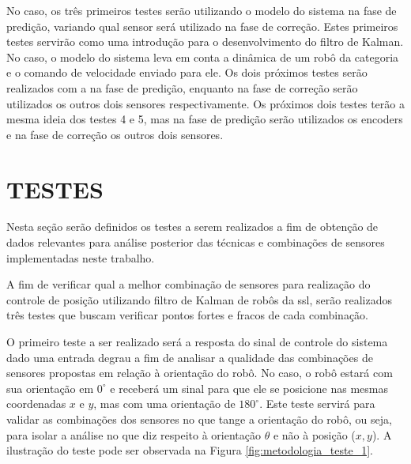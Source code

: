 \documentclass[acronym, symbols, table]{fei}
\begin{document}
		No caso, os três primeiros testes serão utilizando o modelo do sistema na fase de predição, variando qual sensor será utilizado na fase de correção. Estes primeiros testes servirão como uma introdução para o desenvolvimento do filtro de Kalman. No caso, o modelo do sistema leva em conta a dinâmica de um robô da categoria  e o comando de velocidade enviado para ele. Os dois próximos testes serão realizados com a  na fase de predição, enquanto na fase de correção serão utilizados os outros dois sensores respectivamente. Os próximos dois testes terão a mesma ideia dos testes 4 e 5, mas na fase de predição serão utilizados os encoders e na fase de correção os outros dois sensores.
	
	\section{TESTES}
	
		Nesta seção serão definidos os testes a serem realizados a fim de obtenção de dados relevantes para análise posterior das técnicas e combinações de sensores implementadas neste trabalho.
		
		A fim de verificar qual a melhor combinação de sensores para realização do controle de posição utilizando filtro de Kalman de robôs da \acrshort{ssl}, serão realizados três testes que buscam verificar pontos fortes e fracos de cada combinação.
		
		O primeiro teste a ser realizado será a resposta do sinal de controle do sistema dado uma entrada degrau a fim de analisar a qualidade das combinações de sensores propostas em relação à orientação do robô. No caso, o robô estará com sua orientação em $0^\circ$ e receberá um sinal para que ele se posicione nas mesmas coordenadas $x$ e $y$, mas com uma orientação de $180^\circ$. Este teste servirá para validar as combinações dos sensores no que tange a orientação do robô, ou seja, para isolar a análise no que diz respeito à orientação $\theta$ e não à posição ($x, y$). A ilustração do teste pode ser observada na Figura \ref{fig:metodologia_teste_1}.
		
\end{document}
